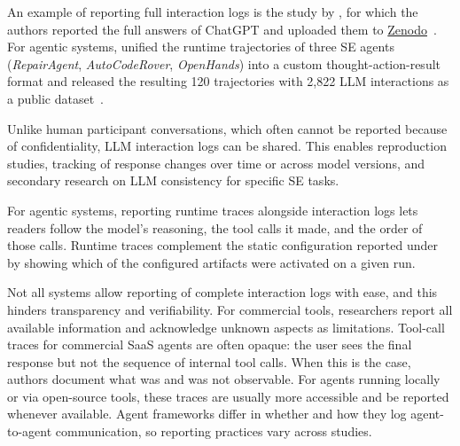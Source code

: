 
An example of reporting full interaction logs is the study by \citeauthor{ronanki2023investigating}, for which the authors reported the full answers of ChatGPT and uploaded them to \href{https://zenodo.org/records/8124936}{Zenodo}~\cite{ronanki2023investigating}.
For agentic systems, \citeauthor{DBLP:conf/kbse/BouzeniaP25} unified the runtime trajectories of three SE agents (\emph{RepairAgent}, \emph{AutoCodeRover}, \emph{OpenHands}) into a custom thought-action-result format and released the resulting 120 trajectories with 2,822 LLM interactions as a public dataset~\cite{DBLP:conf/kbse/BouzeniaP25}.


Unlike human participant conversations, which often cannot be reported because of confidentiality, LLM interaction logs can be shared.
This enables reproduction studies, tracking of response changes over time or across model versions, and secondary research on LLM consistency for specific SE tasks.

For agentic systems, reporting runtime traces alongside interaction logs lets readers follow the model's reasoning, the tool calls it made, and the order of those calls.
Runtime traces complement the static configuration reported under \design by showing which of the configured artifacts were activated on a given run.


Not all systems allow reporting of complete interaction logs with ease, and this hinders transparency and verifiability.
For commercial tools, researchers \must report all available information and acknowledge unknown aspects as limitations.
Tool-call traces for commercial SaaS agents are often opaque: the user sees the final response but not the sequence of internal tool calls.
When this is the case, authors \should document what was and was not observable.
For agents running locally or via open-source tools, these traces are usually more accessible and \should be reported whenever available.
Agent frameworks differ in whether and how they log agent-to-agent communication, so reporting practices vary across studies.


